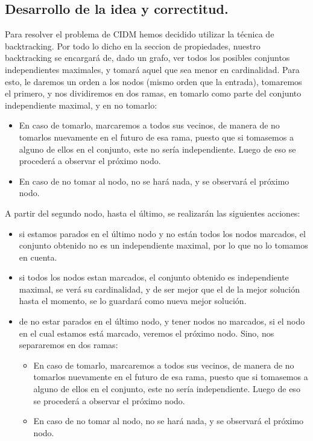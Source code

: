 \subsection{Desarrollo de la idea y correctitud.}

\vspace*{0.3cm}

Para resolver el problema de CIDM hemos decidido utilizar la técnica de backtracking. Por todo lo dicho en la seccion de propiedades, nuestro backtracking se encargará de, dado un grafo, ver todos los posibles conjuntos independientes maximales, y tomará aquel que sea menor en cardinalidad. Para esto, le daremos un orden a los nodos (mismo orden que la entrada), tomaremos el primero, y nos dividiremos en dos ramas, en tomarlo como parte del conjunto independiente maximal, y en no tomarlo:
\begin{itemize}
	\item  En caso de tomarlo, marcaremos a todos sus vecinos, de manera de no tomarlos nuevamente en el futuro de esa rama, puesto que si tomasemos a alguno de ellos en el conjunto, este no sería independiente. Luego de eso se procederá a observar el próximo nodo.
	\item En caso de no tomar al nodo, no se hará nada, y se observará el próximo nodo. 

\end{itemize}

A partir del segundo nodo, hasta el último, se realizarán las siguientes acciones:
\begin{itemize}
	\item si estamos parados en el último nodo y no están todos los nodos marcados, el conjunto obtenido no es un independiente maximal, por lo que no lo tomamos en cuenta.
	\item si todos los nodos estan marcados, el conjunto obtenido es independiente maximal, se verá su cardinalidad, y de ser mejor que el de la mejor solución hasta el momento, se lo guardará como nueva mejor solución.
	\item de no estar parados en el último nodo, y tener nodos no marcados, si el nodo en el cual estamos está marcado, veremos el próximo nodo. Sino, nos separaremos en dos ramas:
	\begin{itemize}
	\item  En caso de tomarlo, marcaremos a todos sus vecinos, de manera de no tomarlos nuevamente en el futuro de esa rama, puesto que si tomasemos a alguno de ellos en el conjunto, este no sería independiente. Luego de eso se procederá a observar el próximo nodo.
	\item En caso de no tomar al nodo, no se hará nada, y se observará el próximo nodo. 
	\end{itemize}
	
\end{itemize}

